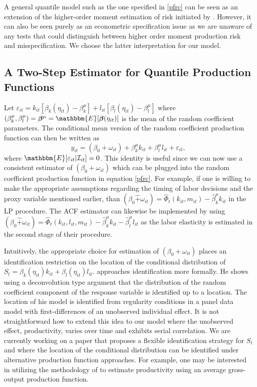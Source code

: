 \documentclass[11pt]{article}
\begin{document}
A general quantile model such as the one specified in \eqref{pfrc} can be seen as an extension of the higher-order moment estimation of risk initiated by \cite{Antle1983}. However, it can also be seen purely as an econometric specification issue as we are unaware of any tests that could distinguish between higher order moment production risk and misspecification. We choose the latter interpretation for our model. 

\subsection{A Two-Step Estimator for Quantile Production Functions}
Let $\varepsilon_{it}=k_{it}[\beta_{k}(\eta_{it})-\beta^{\mu}_{k}]+l_{it}[\beta_{l}(\eta_{it})-\beta^{\mu}_{l}]$ where $(\beta_{k}^{\mu}, \beta_{l}^{\mu})=\boldsymbol{\beta}^{\mu}=\mathbbm{E}[\boldsymbol{\beta}(\eta_{it})]$ is the mean of the random coefficient parameters. The conditional mean version of the random coefficient production function can then be written as
\begin{equation}
y_{it}=(\beta_{0}+\omega_{it})+\beta_{k}^{\mu}k_{it}+\beta_{l}^{\mu}l_{it}+\varepsilon_{it},
\end{equation}
where $\mathbbm{E}[\varepsilon_{it}|\mathcal{I}_{it}]=0$. This identity is useful since we can now use a consistent estimator of $(\beta_{0}+\omega_{it})$ which can be plugged into the random coefficient production function in equation \eqref{pfrc}. For example, if one is willing to make the appropriate assumptions regarding the timing of labor decisions and the proxy variable mentioned earlier, than $(\beta_{0}\hat{+}\omega_{it})=\hat{\Phi}_{t}(k_{it}, m_{it})-\hat{\beta}_{k}^{\mu}k_{it}$ in the LP procedure. The ACF estimator can likewise be implemented by using  $(\beta_{0}\hat{+}\omega_{it})=\hat{\Phi}_{t}(k_{it}, l_{it}, m_{it})-\hat{\beta}_{k}^{\mu}k_{it}-\hat{\beta}_{l}^{\mu}l_{it}$ as the labor elasticity is estimated in the second stage of their procedure.

Intuitively, the appropriate choice for estimation of $(\beta_{0}+\omega_{it})$ places an identification restriction on the location of the conditional distribution of $S_{t}=\beta_{k}(\eta_{it})k_{it}+\beta_{l}(\eta_{it})l_{it}$. \cite{Canay2011} approaches identification more formally. He shows using a deconvolution type argument that the distribution of the random coefficient component of the response variable is identified up to a location. The location of his model is identified from regularity conditions in a panel data model with first-differences of an unobserved individual effect. It is not straightforward how to extend this idea to our model where the unobserved effect, productivity, varies over time and exhibits serial correlation. We are currently working on a paper that proposes a flexible identification strategy for $S_{t}$ and where the location of the conditional distribution can be identified under alternative production function approaches. For example, one may be interested in utilizing the methodology of \cite{Gandhi2020} to estimate productivity using an average gross-output production function. 
\end{document}
